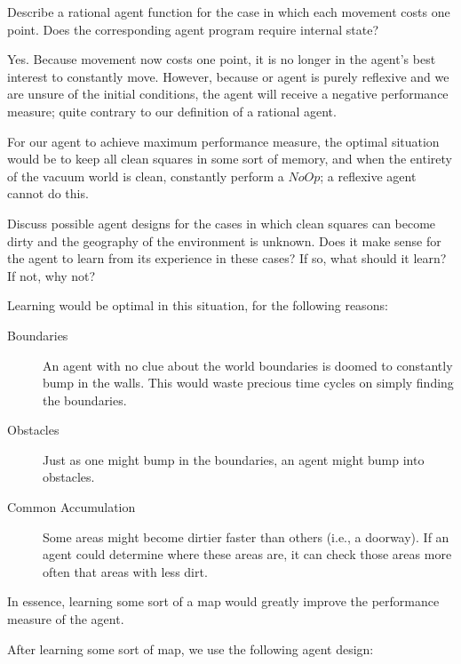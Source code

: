 \documentclass[12pt]{scrartcl}
\begin{document}
\begin{statement}
    Describe a rational agent function for the case in which each movement costs one point. Does the corresponding agent program require internal state?
\end{statement}

Yes. Because movement now costs one point, it is no longer in the agent's best interest to constantly move. However, because or agent is purely reflexive and we are unsure of the initial conditions, the agent will receive a negative performance measure; quite contrary to our definition of a rational agent.

For our agent to achieve maximum performance measure, the optimal situation would be to keep all clean squares in some sort of memory, and when the entirety of the vacuum world is clean, constantly perform a $NoOp$; a reflexive agent cannot do this.

\begin{statement}
Discuss possible agent designs for the cases in which clean squares can become dirty and the geography of the environment is unknown. Does it make sense for the agent to learn from its experience in these cases? If so, what should it learn? If not, why not?
\end{statement}

Learning would be optimal in this situation, for the following reasons:

\begin{description}
    \item[Boundaries] An agent with no clue about the world boundaries is doomed to constantly bump in the walls. This would waste precious time cycles on simply finding the boundaries.
    \item[Obstacles] Just as one might bump in the boundaries, an agent might bump into obstacles.
    \item[Common Accumulation] Some areas might become dirtier faster than others (i.e., a doorway). If an agent could determine where these areas are, it can check those areas more often that areas with less dirt.
\end{description}

In essence, learning some sort of a map would greatly improve the performance measure of the agent.

After learning some sort of map, we use the following agent design:
\end{document}
